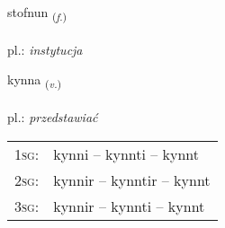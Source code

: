 \documentclass[frontgrid, backgrid]{flacards}\usepackage[]{graphicx}\usepackage[]{xcolor}
\begin{document}
\renewcommand{\flhead}{\vskip5pt \fboxsep=0pt {\small\bfseries\footnotesize Nafnorð | rzeczownik}}
\renewcommand{\fcfoot}{\vskip5pt \fboxsep=0pt \hspace{2pt}{\small\bfseries\footnotesize 1K}}

\renewcommand{\blhead}{\vskip5pt {\small\bfseries\footnotesize Nafnorð | rzeczownik }}
\renewcommand{\bcfoot}{\vskip5pt \hspace{2pt}{\small\bfseries\footnotesize 1K}}


{stofnun \small{\textsubscript{(\textit{f.})}} \\[1ex] %
\textphonetic{[stɔpnʏn]} \\
pl.: \emph{instytucja} \\  [2ex]
\renewcommand*{\arraystretch}{0.8}
}

\renewcommand{\flhead}{\vskip5pt \fboxsep=0pt {\small\bfseries\footnotesize Sagnorð | czasownik}}
\renewcommand{\fcfoot}{\vskip5pt \fboxsep=0pt \hspace{2pt}{\small\bfseries\footnotesize 1K}}

\renewcommand{\blhead}{\vskip5pt {\small\bfseries\footnotesize Sagnorð | czasownik }}
\renewcommand{\bcfoot}{\vskip5pt \hspace{2pt}{\small\bfseries\footnotesize 1K}}


{kynna \small{\textsubscript{(\textit{v.})}} \\[1ex] %
\textphonetic{[cʰɪna]} \\
pl.: \emph{przedstawiać} \\  [2ex]
\renewcommand*{\arraystretch}{0.8}
\begin{tabular}{p{1cm}l}
\textsc{1sg}: & kynni -- kynnti -- kynnt \\ 
\textsc{2sg}: & kynnir -- kynntir -- kynnt \\ 
\textsc{3sg}: & kynnir -- kynnti -- kynnt \\ 
\end{tabular}
}
\end{document}

